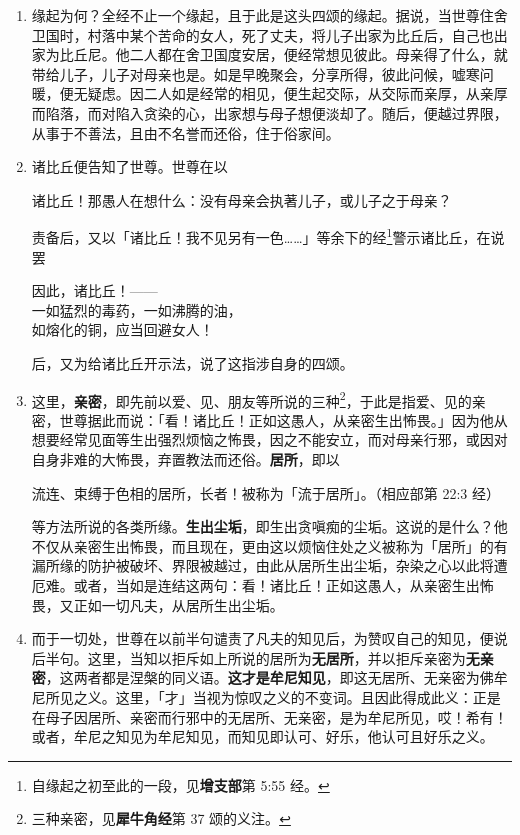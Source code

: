 \begin{enumerate}\item 缘起为何？全经不止一个缘起，且于此是这头四颂的缘起。据说，当世尊住舍卫国时，村落中某个苦命的女人，死了丈夫，将儿子出家为比丘后，自己也出家为比丘尼。他二人都在舍卫国度安居，便经常想见彼此。母亲得了什么，就带给儿子，儿子对母亲也是。如是早晚聚会，分享所得，彼此问候，嘘寒问暖，便无疑虑。因二人如是经常的相见，便生起交际，从交际而亲厚，从亲厚而陷落，而对陷入贪染的心，出家想与母子想便淡却了。随后，便越过界限，从事于不善法，且由不名誉而还俗，住于俗家间。
\item 诸比丘便告知了世尊。世尊在以\begin{quoting}诸比丘！那愚人在想什么：没有母亲会执著儿子，或儿子之于母亲？\end{quoting}责备后，又以「诸比丘！我不见另有一色……」等余下的经\footnote{自缘起之初至此的一段，见\textbf{增支部}第 5:55 经。}警示诸比丘，在说罢\begin{quoting}因此，诸比丘！——\\一如猛烈的毒药，一如沸腾的油，\\如熔化的铜，应当回避女人！\end{quoting}后，又为给诸比丘开示法，说了这指涉自身的四颂。
\item 这里，\textbf{亲密}，即先前以爱、见、朋友等所说的三种\footnote{三种亲密，见\textbf{犀牛角经}第 37 颂的义注。}，于此是指爱、见的亲密，世尊据此而说：「看！诸比丘！正如这愚人，从亲密生出怖畏。」因为他从想要经常见面等生出强烈烦恼之怖畏，因之不能安立，而对母亲行邪，或因对自身非难的大怖畏，弃置教法而还俗。\textbf{居所}，即以\begin{quoting}流连、束缚于色相的居所，长者！被称为「流于居所」。（相应部第 22:3 经）\end{quoting}等方法所说的各类所缘。\textbf{生出尘垢}，即生出贪嗔痴的尘垢。这说的是什么？他不仅从亲密生出怖畏，而且现在，更由这以烦恼住处之义被称为「居所」的有漏所缘的防护被破坏、界限被越过，由此从居所生出尘垢，杂染之心以此将遭厄难。或者，当如是连结这两句：看！诸比丘！正如这愚人，从亲密生出怖畏，又正如一切凡夫，从居所生出尘垢。
\item 而于一切处，世尊在以前半句谴责了凡夫的知见后，为赞叹自己的知见，便说后半句。这里，当知以拒斥如上所说的居所为\textbf{无居所}，并以拒斥亲密为\textbf{无亲密}，这两者都是涅槃的同义语。\textbf{这才是牟尼知见}，即这无居所、无亲密为佛牟尼所见之义。这里，「才」当视为惊叹之义的不变词。且因此得成此义：正是在母子因居所、亲密而行邪中的无居所、无亲密，是为牟尼所见，哎！希有！或者，牟尼之知见为牟尼知见，而知见即认可、好乐，他认可且好乐之义。\end{enumerate}

